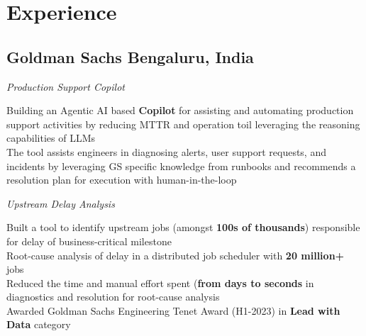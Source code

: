 \documentclass[a4paper]{Resume}
\begin{document}

\descript{}

\section{Experience} 
\hrulefill 

\subsection{Goldman Sachs \hfill \normalfont Bengaluru, India}

\textit{Production Support Copilot}

\pt Building an Agentic AI based \textbf{Copilot} for assisting and automating production support activities by reducing MTTR and operation toil leveraging the reasoning capabilities of LLMs \\
\pt The tool assists engineers in diagnosing alerts, user support requests, and incidents by leveraging GS specific knowledge from runbooks and recommends a resolution plan for execution with human-in-the-loop \\

\sectionsep{}


\textit{Upstream Delay Analysis}

\pt Built a tool to identify upstream jobs (amongst \textbf{100s of thousands}) responsible for delay of business-critical milestone \\
\pt Root-cause analysis of delay in a distributed job scheduler with \textbf{20 million+} jobs \\
\pt Reduced the time and manual effort spent (\textbf{from days to seconds} in diagnostics and resolution for root-cause analysis \\
\pt Awarded Goldman Sachs Engineering Tenet Award (H1-2023) in \textbf{Lead with Data} category \\
\end{document}

